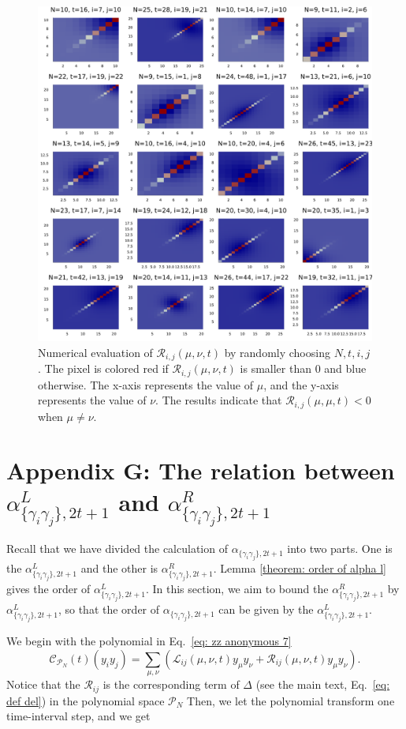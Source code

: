\documentclass[journal=jctcce,a4paper,manuscript=article]{achemso}
\newcommand{\alpl}{\alpha_{\{\gamma_i\gamma_j\}, 2t+1}^{L}}
\newcommand{\alpr}{\alpha_{\{\gamma_i\gamma_j\}, 2t+1}^{R}}
\begin{document}
\begin{figure}[ht]
    \centering
    \includegraphics[width=\linewidth]{figures/appendix/assumption.pdf}
    \caption{ Numerical evaluation of  $\mathscr{R}_{i, j}(\mu, \nu, t)$ by randomly choosing $N, t, i, j$. The pixel is colored red if $\mathscr{R}_{i, j}(\mu, \nu, t)$ is smaller than 0 and blue otherwise. The x-axis represents the value of $\mu$, and the y-axis represents the value of $\nu$. The results indicate that $\mathscr{R}_{i, j}(\mu, \mu, t)<0$ when $\mu\neq\nu$.}
    \label{fig: appendix assumption}
  \end{figure}


\section{Appendix G: The relation between $\alpl$ and $\alpr$}
\label{appendix relation between alphaL and alpha}
Recall that we have divided the calculation of $\alpha_{\{\gamma_i\gamma_j\}, 2t+1}$ into two parts. One is the $\alpl$ and the other is $\alpr$. Lemma \ref{theorem: order of alpha l} gives the order of $\alpl$. In this section, we aim to bound the $\alpr$ by $\alpl$, so that the order of $\alpha_{\{\gamma_i\gamma_j\}, 2t+1}$ can be given by the $\alpl$.

We begin with the polynomial in Eq.~\eqref{eq: zz anonymous 7}
\begin{equation}
  \label{eq: zz anonymous 21}
  \mathcal{C}_{\mathcal{P}_N} (t) (y_i y_j)
  =\sum_{\mu,\nu} \left(\mathscr{L}_{ij} (\mu, \nu, t) y_\mu y_\nu + \mathscr{R}_{ij} (\mu, \nu, t) y_\mu y_\nu\right).
\end{equation}
Notice that the $\mathscr{R}_{ij}$ is the corresponding term of $\Delta$ (see the main text, Eq.~\eqref{eq: def del}) in the polynomial space $\mathcal{P}_N$
Then, we let the polynomial transform one time-interval step, and we get
\end{document}
